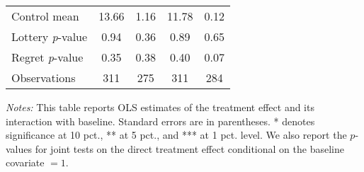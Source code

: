 \begin{table}[htbp]
{\begin{threeparttable}
\begin{tabular}{l*{4}{c}}
Control mean    &    13.66         &     1.16         &    11.78         &     0.12         \\
Lottery \emph{p}-value&     0.94         &     0.36         &     0.89         &     0.65         \\
Regret \emph{p}-value&     0.35         &     0.38         &     0.40         &     0.07         \\
Observations    &      311         &      275         &      311         &      284         \\
\bottomrule \end{tabular} \begin{tablenotes}[flushleft] \footnotesize \item \emph{Notes:} This table reports OLS estimates of the treatment effect and its interaction with baseline. Standard errors are in parentheses. * denotes significance at 10 pct., ** at 5 pct., and *** at 1 pct. level. We also report the \(p\)-values for joint tests on the direct treatment effect conditional on the baseline covariate $= 1$. \end{tablenotes} \end{threeparttable} } \end{table}
